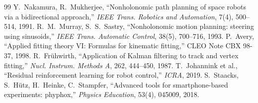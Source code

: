 \documentclass[paper=a4paper,fontsize=10pt,twocolumn,column_gap=2zw,line_length=24zw,number_of_lines=46,head_space=20mm]{jlreq}
\begin{document}
\begin{thebibliography}{99}
 Y.~Nakamura, R.~Mukherjee, ``Nonholonomic path planning of space robots via a bidirectional approach,'' \textit{IEEE Trans. Robotics and Automation}, 7(4), 500--514, 1991.
 R.~M.~Murray, S.~S.~Sastry, ``Nonholonomic motion planning: steering using sinusoids,'' \textit{IEEE Trans. Automatic Control}, 38(5), 700--716, 1993.
 P.~Avery, ``Applied fitting theory VI: Formulas for kinematic fitting,'' CLEO Note CBX 98-37, 1998.
 R.~Frühwirth, ``Application of Kalman filtering to track and vertex fitting,'' \textit{Nucl. Instrum. Methods A}, 262, 444--450, 1987.
 T.~Johannink et al., ``Residual reinforcement learning for robot control,'' \textit{ICRA}, 2019.
 S.~Staacks, S.~Hütz, H.~Heinke, C.~Stampfer, ``Advanced tools for smartphone-based experiments: phyphox,'' \textit{Physics Education}, 53(4), 045009, 2018.
\end{thebibliography}
\end{document}
